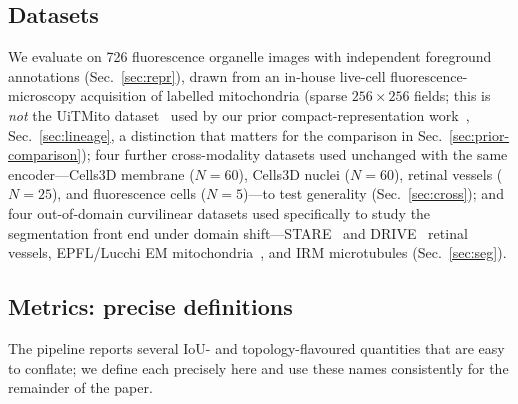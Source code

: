 \documentclass[10pt,a4paper]{article}
\begin{document}
\subsection{Datasets}
We evaluate on 726 fluorescence organelle images with independent foreground
annotations (Sec.~\ref{sec:repr}), drawn from an in-house live-cell
fluorescence-microscopy acquisition of labelled mitochondria (sparse
$256\times256$ fields; this is \emph{not} the UiTMito
dataset~\cite{sekh2021} used by our prior compact-representation
work~\cite{malakar2025eaai,banerjee2023acpr,banerjee2024gunetpp},
Sec.~\ref{sec:lineage}, a distinction that matters for the comparison in
Sec.~\ref{sec:prior-comparison}); four further cross-modality datasets used
unchanged with the same encoder---Cells3D membrane ($N{=}60$), Cells3D nuclei
($N{=}60$), retinal vessels ($N{=}25$), and fluorescence cells
($N{=}5$)---to test generality (Sec.~\ref{sec:cross}); and four out-of-domain
curvilinear datasets used specifically to study the segmentation front end
under domain shift---STARE~\cite{stare} and DRIVE~\cite{drive} retinal
vessels, EPFL/Lucchi EM mitochondria~\cite{lucchi}, and IRM microtubules
(Sec.~\ref{sec:seg}).

\subsection{Metrics: precise definitions}
\label{sec:metrics}
The pipeline reports several IoU- and topology-flavoured quantities that are
easy to conflate; we define each precisely here and use these names
consistently for the remainder of the paper.
\end{document}
